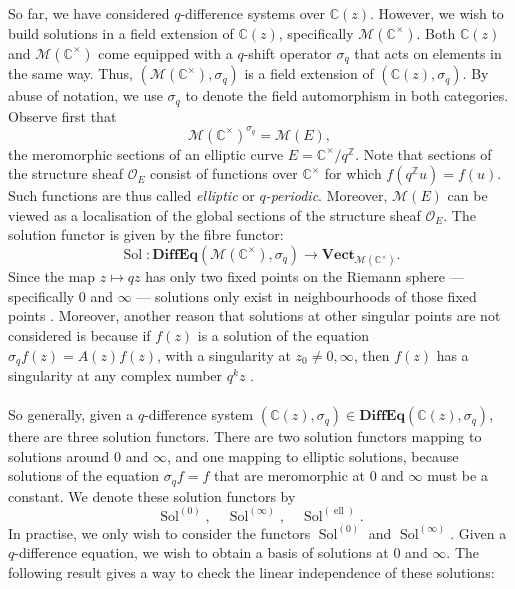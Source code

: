 \documentclass[a4paper]{report}
\theoremstyle{theorem}
\theoremstyle{definition}
\theoremstyle{remark}
\theoremstyle{proposition}
\theoremstyle{conjecture}
\theoremstyle{lemma}
\theoremstyle{corollary}
\theoremstyle{exercise}
\theoremstyle{example}
\newcommand{\C}{\mathbb{C}}
\newcommand{\mcal}{\mathcal}
\newcommand{\on}{\operatorname}
\begin{document}
  So far, we have considered $q$-difference systems over $\C(z)$. However,
  we wish to build solutions in a field extension of $\C(z)$, specifically 
  $\mcal{M}(\C^\times)$. Both $\C(z)$ and $\mcal{M}(\C^\times)$ come equipped
  with a $q$-shift operator $\sigma_q$ that acts on elements in the same way.
  Thus, $(\mcal{M}(\C^\times),\sigma_q)$ is a field extension of $(\C(z),\sigma_q)$.
  By abuse of notation, we use $\sigma_q$ to denote the field automorphism in both categories.
  Observe first that
  $$\mcal{M}(\C^\times)^{\sigma_q} = \mcal{M}(E),$$
  the meromorphic sections of an elliptic curve 
  $E = \C^\times/q^{\mathbb{Z}}$. Note that sections of the structure sheaf $\mcal{O}_E$
  consist of functions over $\C^\times$ for which $f(q^{\mathbb{Z}}u) = f(u)$. Such functions 
  are thus called \emph{elliptic} or \emph{$q$-periodic}. Moreover, $\mcal{M}(E)$ can be viewed as a 
  localisation of the global sections of the structure sheaf $\mcal{O}_E$.
  The solution functor is given by the fibre functor:
  $$\on{Sol} : \mathbf{DiffEq}(\mcal{M}(\C^\times), \sigma_q) \longrightarrow \mathbf{Vect}_{\mcal{M}(\C^\times)}.$$
  Since the map 
  $z\mapsto qz$ has only two fixed points on the Riemann sphere --- 
  specifically $0$ and $\infty$ --- solutions only exist in neighbourhoods 
  of those fixed points \cite{efk98}. 
  Moreover, another reason that solutions at other 
  singular points are not considered is because if $f(z)$ is a solution of 
  the equation $\sigma_qf(z) = A(z)f(z)$, with a singularity at 
  $z_0\neq 0,\infty$, then $f(z)$ has a singularity at any complex number 
  $q^kz$ \cite[Remark 2.7]{RW22}. \\\\
  So generally, given a $q$-difference system 
  $(\C(z),\sigma_q) \in \mathbf{DiffEq}(\C(z), \sigma_q)$, there are three 
  solution functors. There are two solution functors mapping to 
  solutions around $0$ and $\infty$, and one mapping to elliptic solutions,
  because solutions of the equation $\sigma_qf = f$ that are meromorphic
  at $0$ and $\infty$ must be a constant. We denote these solution functors by
  $$\on{Sol}^{(0)},\quad \on{Sol}^{(\infty)},\quad \on{Sol}^{(\on{ell})}.$$
  In practise, we only wish to consider the functors $\on{Sol}^{(0)}$
  and $\on{Sol}^{(\infty)}$.
  Given a $q$-difference equation, we wish to obtain a basis of solutions at 
  $0$ and $\infty$. The following result gives a way to check the linear 
  independence of these solutions:
\end{document}

